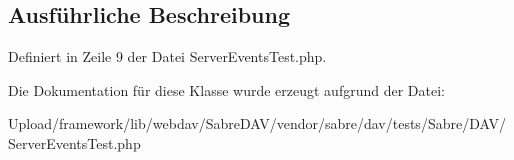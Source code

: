 \subsection{Ausführliche Beschreibung}


Definiert in Zeile 9 der Datei Server\+Events\+Test.\+php.



Die Dokumentation für diese Klasse wurde erzeugt aufgrund der Datei\+:\begin{DoxyCompactItemize}
\item 
Upload/framework/lib/webdav/\+Sabre\+D\+A\+V/vendor/sabre/dav/tests/\+Sabre/\+D\+A\+V/Server\+Events\+Test.\+php\end{DoxyCompactItemize}
